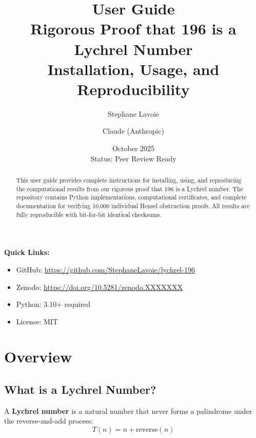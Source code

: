 \documentclass[11pt,a4paper]{article}
\title{
    \vspace{-1.5cm}
    \huge\textbf{User Guide}\\
    \vspace{0.3cm}
    \Large Rigorous Proof that 196 is a Lychrel Number\\
    \vspace{0.3cm}
    \large Installation, Usage, and Reproducibility
}
\author{
    \large Stephane Lavoie 
    \and 
    \large Claude (Anthropic)
}
\date{
    \large October 2025\\
    \vspace{0.3cm}
    \normalsize Status: Peer Review Ready
}
\begin{document}
\maketitle
\thispagestyle{empty}

\begin{abstract}
\noindent
This user guide provides complete instructions for installing, using, and reproducing the computational results from our rigorous proof that 196 is a Lychrel number. The repository contains Python implementations, computational certificates, and complete documentation for verifying 10,000 individual Hensel obstruction proofs. All results are fully reproducible with bit-for-bit identical checksums.
\end{abstract}

\vspace{0.5cm}

\begin{infobox}
\textbf{Quick Links:}
\begin{itemize}[leftmargin=*,noitemsep]
\item GitHub: \url{https://github.com/StephaneLavoie/lychrel-196}
\item Zenodo: \url{https://doi.org/10.5281/zenodo.XXXXXXX}
\item Python: 3.10+ required
\item License: MIT
\end{itemize}
\end{infobox}

\clearpage

\tableofcontents
\clearpage

\section{Overview}

\subsection{What is a Lychrel Number?}

A \textbf{Lychrel number} is a natural number that never forms a palindrome under the reverse-and-add process:
\begin{equation}
T(n) = n + \text{reverse}(n)
\end{equation}
\end{document}
